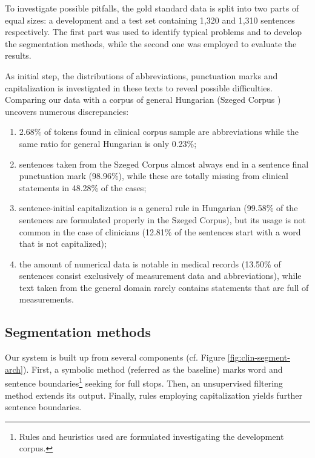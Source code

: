To investigate possible pitfalls, the gold standard data is split into two parts of equal sizes: a development and a test set containing 1,320 and 1,310 sentences respectively. 
The first part was used to identify typical problems and to develop the segmentation methods, while the second one was employed to evaluate the results. 

As initial step, the distributions of abbreviations, punctuation marks and capitalization is investigated in these texts to reveal possible difficulties. 
Comparing our data with a corpus of general Hungarian (Szeged Corpus \cite{Csendes2004}) uncovers numerous discrepancies: 
\begin{enumerate}
 \item 2.68\% of tokens found in clinical corpus sample are abbreviations while the same ratio for general Hungarian is only 0.23\%; 
 \item sentences taken from the Szeged Corpus almost always end in a sentence final punctuation mark (98.96\%), while these are totally missing from clinical statements in 48.28\% of the cases; 
 \item sentence-initial capitalization is a general rule in Hungarian (99.58\% of the sentences are formulated properly in the Szeged Corpus), but its usage is not common in the case of clinicians (12.81\% of the sentences start with a word that is not capitalized); 
 \item the amount of numerical data is notable in medical records (13.50\% of sentences consist exclusively of measurement data and abbreviations), while text taken from the general domain rarely contains statements that are full of measurements. 
\end{enumerate}




\subsection{Segmentation methods}
\label{sec:clinical_segmentation}

Our system is built up from several components (cf. Figure \ref{fig:clin-segment-arch}). 
First, a symbolic method (referred as the baseline) marks word and sentence boundaries\footnote{Rules and heuristics used are formulated investigating the development corpus.} seeking for full stops. 
Then, an unsupervised filtering method extends its output.
Finally, rules employing capitalization yields further sentence boundaries.

